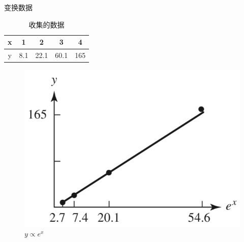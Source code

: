\documentclass[UTF8]{ctexbeamer}
\begin{document}
\begin{frame}{变换数据}

  \begin{table}
    \centering
    \begin{tabular}{c|cccc}
      x & 1 & 2 & 3 & 4\\
      \hline{}
      y & 8.1 & 22.1 & 60.1 & 165
    \end{tabular}
    \caption{收集的数据}
  \end{table}

  \begin{figure}
    \centering
    \includegraphics[height=.4\textheight{}]{y-exp.png}
    \caption{$y \propto e^x$}
  \end{figure}
\end{frame}
\end{document}
